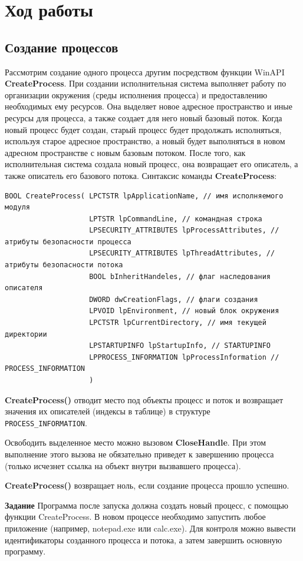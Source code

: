 \documentclass[a4paper]{article}
\begin{document}
\section{Ход работы}
\subsection{Создание процессов}
	Рассмотрим создание одного процесса другим посредством функции WinAPI \textbf{CreateProcess}. При создании исполнительная система выполняет работу по организации окружения (среды исполнения процесса) и предоставлению необходимых ему ресурсов. Она выделяет новое адресное пространство и иные ресурсы для процесса, а также создает для него новый базовый поток. Когда новый процесс будет создан, старый процесс будет продолжать исполняться, используя старое адресное пространство, а новый будет выполняться в новом адресном пространстве с новым базовым потоком. После того, как исполнительная система создала новый процесс, она возвращает его описатель, а также описатель его базового потока.
	Синтаксис команды \textbf{CreateProcess}:
	\begin{lstlisting}[style=crs_cpp]
BOOL CreateProcess( LPCTSTR lpApplicationName, // имя исполняемого модуля
					LPTSTR lpCommandLine, // командная строка
					LPSECURITY_ATTRIBUTES lpProcessAttributes, // атрибуты безопасности процесса 
					LPSECURITY_ATTRIBUTES lpThreadAttributes, // атрибуты безопасности потока 
					BOOL bInheritHandeles, // флаг наследования описателя 					
					DWORD dwCreationFlags, // флаги создания
					LPVOID lpEnvironment, // новый блок окружения 
					LPCTSTR lpCurrentDirectory, // имя текущей директории 
					LPSTARTUPINFO lpStartupInfo, // STARTUPINFO
					LPPROCESS_INFORMATION lpProcessInformation // PROCESS_INFORMATION 
					)
	\end{lstlisting}
	
	\textbf{CreateProcess()} отводит место под объекты процесс и поток и возвращает значения их описателей (индексы в таблице) в структуре\\ \texttt{PROCESS\_INFORMATION}.
	
	Освободить выделенное место можно вызовом \textbf{CloseHandle}. При этом выполнение этого вызова не обязательно приведет к завершению процесса (только исчезнет ссылка на объект внутри вызвавшего процесса).
	
	\textbf{CreateProcess()} возвращает ноль, если создание процесса прошло успешно.
	
	\textbf{Задание} Программа после запуска должна создать новый процесс, с помощью функции CreateProcess. В новом процессе необходимо запустить любое приложение (например, notepad.exe или calc.exe). Для контроля можно вывести идентификаторы созданного процесса и потока, а затем завершить основную программу.
	
\end{document}
